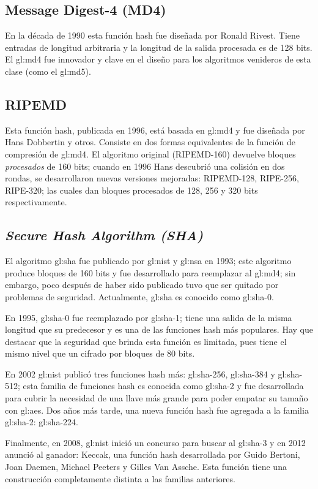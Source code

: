 \subsection{Message Digest-4 (MD4)}

En la década de 1990 esta función hash fue diseñada por Ronald Rivest.
Tiene entradas de longitud arbitraria y la longitud de la salida
procesada es de 128 bits. El \gls{gl:md4} fue innovador y
clave en el diseño para los algoritmos venideros de esta clase (como
el \gls{gl:md5}).

\subsection{RIPEMD}

Esta función hash, publicada en 1996, está basada en \gls{gl:md4} y fue
diseñada por Hans Dobbertin y otros. Consiste en dos formas equivalentes de la
función de compresión de \gls{gl:md4}. El algoritmo original (RIPEMD-160)
devuelve bloques \textit{procesados} de 160 bits; cuando en 1996 Hans
descubrió una colisión en dos rondas, se desarrollaron nuevas versiones
mejoradas: RIPEMD-128, RIPE-256, RIPE-320; las cuales dan bloques procesados de
128, 256 y 320 bits respectivamente.

\subsection{\textit{Secure Hash Algorithm (SHA)}}

El algoritmo \gls{gl:sha} fue publicado por \gls{gl:nist} y
\gls{gl:nsa} en 1993; este algoritmo produce bloques de 160 bits y
fue desarrollado para reemplazar al \gls{gl:md4}; sin embargo, poco
después de haber sido publicado tuvo que ser quitado por problemas de
seguridad. Actualmente, \gls{gl:sha} es conocido como \gls{gl:sha}-0.

En 1995, \gls{gl:sha}-0 fue reemplazado por \gls{gl:sha}-1; tiene
una salida de la misma longitud que su predecesor y es una de las funciones
hash más populares. Hay que destacar que la seguridad que brinda esta función
es limitada, pues tiene el mismo nivel que un cifrado por bloques de 80 bits.

En 2002 \gls{gl:nist} publicó tres funciones hash más:
\gls{gl:sha}-256, \gls{gl:sha}-384 y \gls{gl:sha}-512; esta
familia de funciones hash es conocida como \gls{gl:sha}-2 y fue
desarrollada para cubrir la necesidad de una llave más grande para poder
empatar su tamaño con \gls{gl:aes}. Dos años más tarde, una nueva
función hash fue agregada a la familia \gls{gl:sha}-2:
\gls{gl:sha}-224.

Finalmente, en 2008, \gls{gl:nist} inició un concurso para buscar al
\gls{gl:sha}-3 y en 2012 anunció al ganador: Keccak, una función hash
desarrollada por Guido Bertoni, Joan Daemen, Michael Peeters y Gilles Van
Assche. Esta función tiene una construcción completamente distinta a las
familias anteriores.
